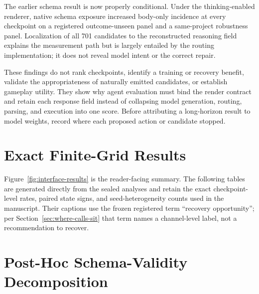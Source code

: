 \documentclass[10pt]{article}
\begin{document}
The earlier schema result is now properly conditional. Under the
thinking-enabled renderer, native schema exposure increased body-only incidence
at every checkpoint on a registered outcome-unseen panel and a same-project
robustness panel. Localization of all 701 candidates to the reconstructed
reasoning field explains the measurement path but is largely entailed by the
routing implementation; it does not reveal model intent or the correct repair.

These findings do not rank checkpoints, identify a training or recovery
benefit, validate the appropriateness of naturally emitted candidates, or
establish gameplay utility. They show why agent evaluation must bind the render
contract and retain each
response field instead of collapsing model generation, routing, parsing, and
execution into one score. Before attributing a long-horizon result to model
weights, record where each proposed action or candidate stopped.




\appendix
\raggedbottom

\section{Exact Finite-Grid Results}
\label{app:exact-grids}

Figure~\ref{fig:interface-results} is the reader-facing summary. The following
tables are generated directly from the sealed analyses and retain the exact
checkpoint-level rates, paired state signs, and seed-heterogeneity counts used
in the manuscript. Their captions use the frozen registered term ``recovery
opportunity''; per Section~\ref{sec:where-calls-sit} that term names a
channel-level label, not a recommendation to recover.

\begingroup
\renewenvironment{table*}[1][]{\begin{table}[H]}{\end{table}}

\endgroup



\section{Post-Hoc Schema-Validity Decomposition}
\label{app:validity}
\end{document}
